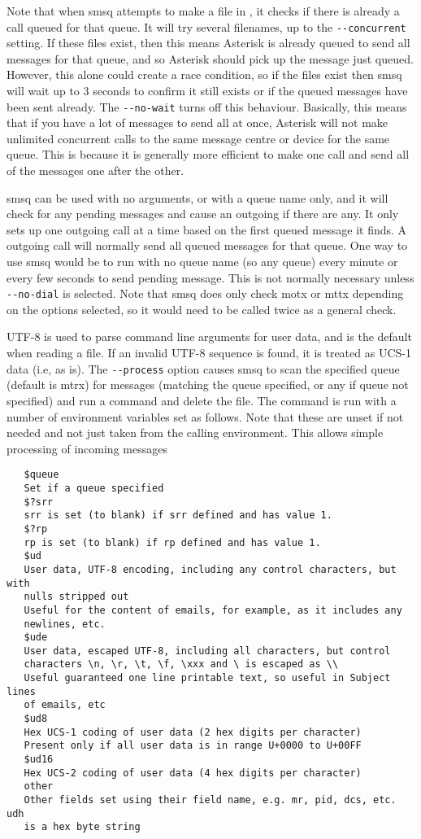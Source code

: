    Note that when smsq attempts to make a file in
   , it checks if there is already a call
   queued for that queue. It will try several filenames, up to the
   \verb!--concurrent! setting. If these files exist, then this means Asterisk
   is already queued to send all messages for that queue, and so Asterisk
   should pick up the message just queued. However, this alone could
   create a race condition, so if the files exist then smsq will wait up
   to 3 seconds to confirm it still exists or if the queued messages have
   been sent already. The \verb!--no-wait! turns off this behaviour. Basically,
   this means that if you have a lot of messages to send all at once,
   Asterisk will not make unlimited concurrent calls to the same message
   centre or device for the same queue. This is because it is generally
   more efficient to make one call and send all of the messages one after
   the other.

   smsq can be used with no arguments, or with a queue name only, and it
   will check for any pending messages and cause an outgoing if there are
   any. It only sets up one outgoing call at a time based on the first
   queued message it finds. A outgoing call will normally send all queued
   messages for that queue. One way to use smsq would be to run with no
   queue name (so any queue) every minute or every few seconds to send
   pending message. This is not normally necessary unless \verb!--no-dial! is
   selected. Note that smsq does only check motx or mttx depending on the
   options selected, so it would need to be called twice as a general
   check.

   UTF-8 is used to parse command line arguments for user data, and is
   the default when reading a file. If an invalid UTF-8 sequence is
   found, it is treated as UCS-1 data (i.e, as is).
   The \verb!--process! option causes smsq to scan the specified queue (default
   is mtrx) for messages (matching the queue specified, or any if queue
   not specified) and run a command and delete the file. The command is
   run with a number of environment variables set as follows. Note that
   these are unset if not needed and not just taken from the calling
   environment. This allows simple processing of incoming messages
\begin{verbatim}
   $queue
   Set if a queue specified
   $?srr
   srr is set (to blank) if srr defined and has value 1.
   $?rp
   rp is set (to blank) if rp defined and has value 1.
   $ud
   User data, UTF-8 encoding, including any control characters, but with
   nulls stripped out
   Useful for the content of emails, for example, as it includes any
   newlines, etc.
   $ude
   User data, escaped UTF-8, including all characters, but control
   characters \n, \r, \t, \f, \xxx and \ is escaped as \\
   Useful guaranteed one line printable text, so useful in Subject lines
   of emails, etc
   $ud8
   Hex UCS-1 coding of user data (2 hex digits per character)
   Present only if all user data is in range U+0000 to U+00FF
   $ud16
   Hex UCS-2 coding of user data (4 hex digits per character)
   other
   Other fields set using their field name, e.g. mr, pid, dcs, etc. udh
   is a hex byte string
\end{verbatim}

